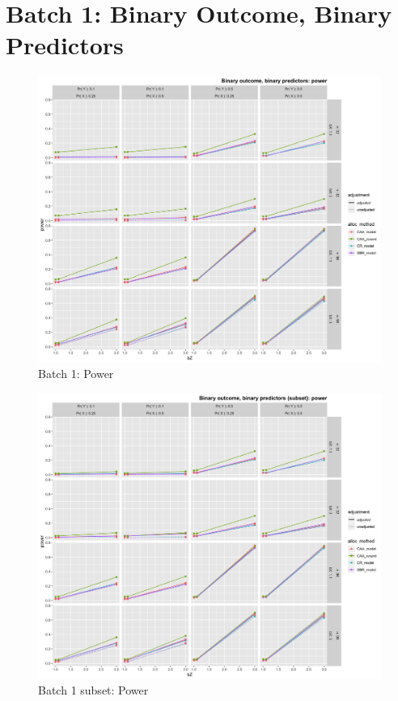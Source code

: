 \section[Binary Y, binary X]{Batch 1: Binary Outcome, Binary Predictors}
\begin{figure}[H]
	\includegraphics[width=\linewidth]{figures/b1_power_all_methods_adj_unadj}
	\caption{Batch 1: Power}
	\label{fig:c7b1p}
\end{figure}

\begin{figure}[H]
	\includegraphics[width=\linewidth]{figures/b1_sub_power_all_methods_adj_unadj}
	\caption{Batch 1 subset: Power}
	\label{fig:c7b1sp}
\end{figure}

